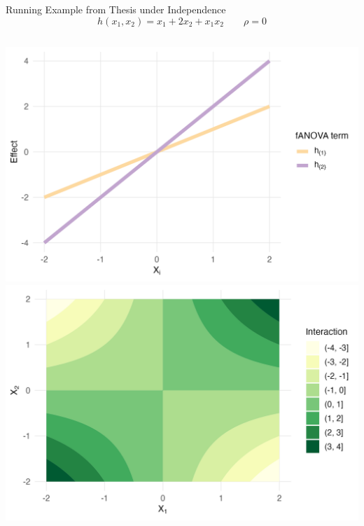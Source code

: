 \begin{frame}{Running Example from Thesis under Independence}
\begin{equation}
  h(x_1, x_2) = x_1 + 2 x_2 + x_1 x_2 \qquad \rho = 0
\end{equation}
    \begin{columns}
      \includegraphics[width=\linewidth]{../images/experiment_section/running_example_a1p10_a2p20_a11p00_a22p00_a12p10_rhop00_main.png}
      \includegraphics[width=\linewidth]{../images/experiment_section/running_example_a1p10_a2p20_a11p00_a22p00_a12p10_rhop00_interaction.png}
  \end{columns}
\end{frame}

